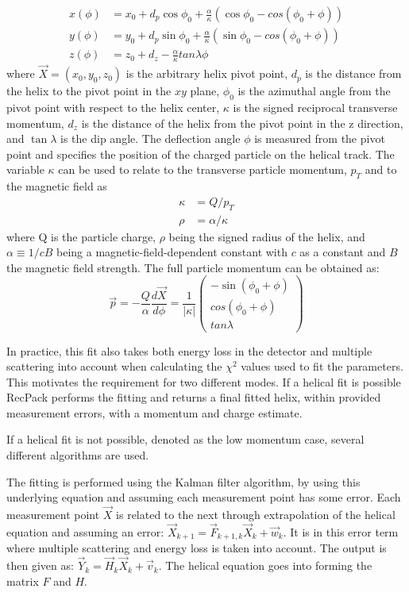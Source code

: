 \begin{align}
x(\phi) &= x_0 + d_p \cos \phi_0 + \frac{\alpha}{\kappa}(\cos \phi_0 - cos(\phi_0 + \phi))\\ 
y(\phi) &= y_0 + d_p \sin \phi_0 + \frac{\alpha}{\kappa}(\sin \phi_0 - cos(\phi_0 + \phi))\\
z(\phi) &= z_0 + d_z - \frac{\alpha}{\kappa} tan \lambda \phi
\end{align}
where $\vec{X} = (x_0, y_0, z_0)$ is the arbitrary helix pivot point, $d_p$ is the distance from the helix to the pivot point in the $xy$ plane, $\phi_0$ is the azimuthal angle from the pivot point with respect to the helix center, $\kappa$ is the signed reciprocal transverse momentum, $d_z$ is the distance of the helix from the pivot point in the z direction, and $\tan\lambda$ is the dip angle. The deflection angle $\phi$ is measured from the pivot point and specifies the position of the charged particle on the helical track. The variable $\kappa$ can be used to relate to the transverse particle momentum, $p_T$ and to the magnetic field as 
\begin{align}
 \kappa &=  Q/p_T \\  
 \rho &=  \alpha/\kappa
 \end{align}
where Q is the particle charge, $\rho$ being the signed radius of the helix, and $\alpha \equiv 1/c B$ being a magnetic-field-dependent constant with $c$ as a constant and $B$ the magnetic field strength. The full particle momentum can be obtained as: 
\begin{equation}
\vec{p} = - \frac{Q}{\alpha} \frac{d\vec{X}}{d\phi} = \frac{1}{|\kappa |} 
 \begin{pmatrix}
 -\sin(\phi_0 + \phi)\\
 cos(\phi_0 + \phi)\\
 tan\lambda
 \end{pmatrix}
\end{equation}

In practice, this fit also takes both energy loss in the detector and multiple scattering into account when calculating the $\chi^2$ values used to fit the parameters. This motivates the requirement for two different modes. If a helical fit is possible RecPack performs the fitting and returns a final fitted helix, within provided measurement errors, with a momentum and charge estimate.

If a helical fit is not possible, denoted as the low momentum case, several different algorithms are used.

The fitting is performed using the Kalman filter algorithm, by using this underlying equation and assuming each measurement point has some error. Each measurement point $\vec{X}$ is related to the next through extrapolation of the helical equation and assuming an error: $\vec{X}_{k+1} = \vec{F}_{k+1,k}\vec{X}_k + \vec{w}_k$. It is in this error term where multiple scattering and energy loss is taken into account. The output is then given as: $\vec{Y}_{k} = \vec{H}_{k}\vec{X}_k + \vec{v}_k$. The helical equation goes into forming the matrix $F$ and $H$.

